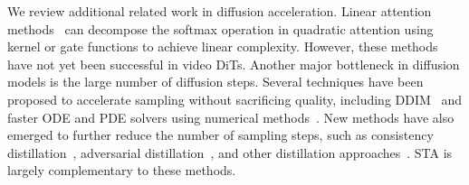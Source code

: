 
We review additional related work in diffusion acceleration.
Linear attention methods~\citep{wang2020linformer, liu2021swin, arar2021learned, yang2024GLA} can decompose the softmax operation in quadratic attention using kernel or gate functions to achieve linear complexity. However, these methods have not yet been successful in video DiTs.
Another major bottleneck in diffusion models is the large number of diffusion steps. Several techniques have been proposed to accelerate sampling without sacrificing quality, including DDIM~\citep{song2020denoising} and faster ODE and PDE solvers using numerical methods~\citep{song2019generative, lu2022dpm, lu2022dpm++, jolicoeur2021gotta}. New methods have also emerged to further reduce the number of sampling steps, such as consistency distillation~\citep{kim2023consistency, song2023consistency, salimans2024multistep, xie2024mlcm}, adversarial distillation~\citep{sauer2023adversarial}, and other distillation approaches~\citep{li2024t2v, yin2023onestep, yin2024one}. STA is largely complementary to these methods.





